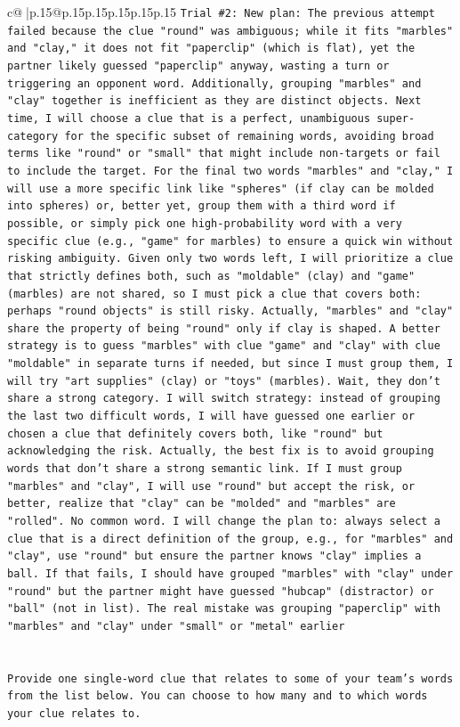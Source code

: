 \documentclass{article}
\begin{document}
{\begin{supertabular}{c@{$\;$}|p{.15\linewidth}@{}p{.15\linewidth}p{.15\linewidth}p{.15\linewidth}p{.15\linewidth}p{.15\linewidth}}
{{{\texttt{Trial \#2: New plan: The previous attempt failed because the clue "round" was ambiguous; while it fits "marbles" and "clay," it does not fit "paperclip" (which is flat), yet the partner likely guessed "paperclip" anyway, wasting a turn or triggering an opponent word. Additionally, grouping "marbles" and "clay" together is inefficient as they are distinct objects. Next time, I will choose a clue that is a perfect, unambiguous super{-}category for the specific subset of remaining words, avoiding broad terms like "round" or "small" that might include non{-}targets or fail to include the target. For the final two words "marbles" and "clay," I will use a more specific link like "spheres" (if clay can be molded into spheres) or, better yet, group them with a third word if possible, or simply pick one high{-}probability word with a very specific clue (e.g., "game" for marbles) to ensure a quick win without risking ambiguity. Given only two words left, I will prioritize a clue that strictly defines both, such as "moldable" (clay) and "game" (marbles) are not shared, so I must pick a clue that covers both: perhaps "round objects" is still risky. Actually, "marbles" and "clay" share the property of being "round" only if clay is shaped. A better strategy is to guess "marbles" with clue "game" and "clay" with clue "moldable" in separate turns if needed, but since I must group them, I will try "art supplies" (clay) or "toys" (marbles). Wait, they don't share a strong category. I will switch strategy: instead of grouping the last two difficult words, I will have guessed one earlier or chosen a clue that definitely covers both, like "round" but acknowledging the risk. Actually, the best fix is to avoid grouping words that don't share a strong semantic link. If I must group "marbles" and "clay", I will use "round" but accept the risk, or better, realize that "clay" can be "molded" and "marbles" are "rolled". No common word. I will change the plan to: always select a clue that is a direct definition of the group, e.g., for "marbles" and "clay", use "round" but ensure the partner knows "clay" implies a ball. If that fails, I should have grouped "marbles" with "clay" under "round" but the partner might have guessed "hubcap" (distractor) or "ball" (not in list). The real mistake was grouping "paperclip" with "marbles" and "clay" under "small" or "metal" earlier} \\
\\ 
\\ 
\texttt{Provide one single{-}word clue that relates to some of your team's words from the list below. You can choose to how many and to which words your clue relates to.} \\
}}}
\end{supertabular}}
\end{document}
